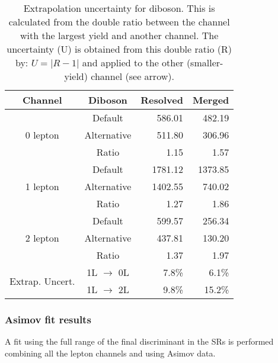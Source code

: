 \begin{table}[h]
  \centering
  \begin{tabular}{|c|c|r|r|} \hline
    Channel                         & Diboson             & Resolved & Merged \\    \hline
    \multirow{3}{*}{0 lepton}       & Default             &  586.01 &  482.19 \\
             &                        Alternative         &  511.80 &  306.96 \\
             &                        Ratio               &    1.15 &    1.57 \\    \hline
    \multirow{3}{*}{1 lepton}       & Default             & 1781.12 & 1373.85 \\
             &                        Alternative         & 1402.55 &  740.02 \\
             &                        Ratio               &    1.27 &    1.86 \\    \hline
    \multirow{3}{*}{2 lepton}       & Default             &  599.57 &  256.34 \\
             &                        Alternative         &  437.81 &  130.20 \\
             &                        Ratio               &    1.37 &    1.97 \\    \hline
    \multirow{2}{*}{Extrap. Uncert.}& 1L $\rightarrow$ 0L &   7.8\% &   6.1\% \\    
                                    & 1L $\rightarrow$ 2L &   9.8\% &  15.2\% \\    \hline
  \end{tabular}
  \caption{Extrapolation uncertainty for diboson. This is calculated from the double ratio between the channel with the largest yield and another channel. The uncertainty (U) is obtained from this double ratio (R) by: $U=|R-1|$ and applied to the other (smaller-yield) channel (see arrow).}
  \label{tab:extrapolationNorm:VV}
\end{table}






\clearpage
\subsubsection{Asimov fit results}
A fit using the full range of the final discriminant in the SRs is performed combining all the lepton channels
and using Asimov data.

